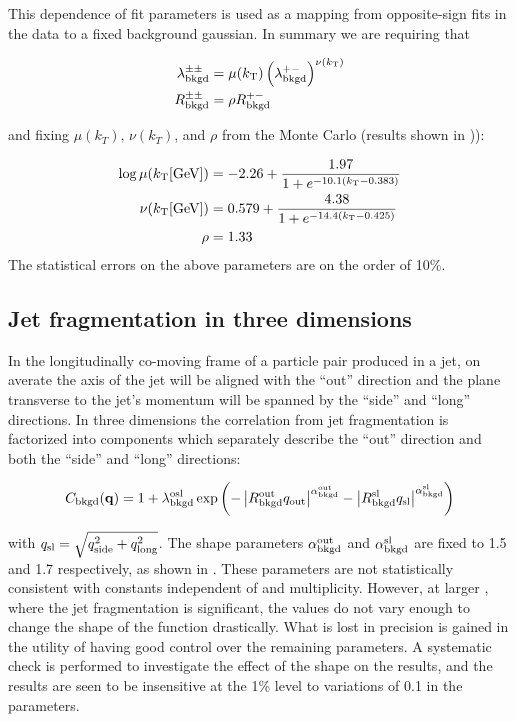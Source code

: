 This \kt dependence of fit parameters is used as a mapping from opposite-sign fits in the data to a fixed background gaussian.
In summary we are requiring that

\begin{align}
\lambda_{\mathrm{bkgd}}^{\pm\pm} &= \mu(k_\mathrm{T}) \left(\lambda_{\mathrm{bkgd}}^{+-}\right)^{\nu(k_\mathrm{T})} \label{eqn:lambdaBackPar}\\
R_{\mathrm{bkgd}}^{\pm\pm} &= \rho R_{\mathrm{bkgd}}^{+-} \label{eqn:rBackPar}
\end{align}

and fixing $\mu(k_T)$, $\nu(k_T)$, and $\rho$ from the Monte Carlo (results shown in )):

\begin{align}
\log \mu (\kt [\textrm{GeV}]) &= -2.26 + \frac{1.97}{1 + e^{-10.1 (\kt - 0.383)}} \label{eqn:mu}\\
\nu(\kt [\textrm{GeV}]) &= 0.579 + \frac{4.38}{1 + e^{-14.4 (\kt - 0.425)}} \label{eqn:nu}\\
\rho &= 1.33 \label{eqn:rho} %
\end{align}
The statistical errors on the above parameters are on the order of 10\%.


\subsection{Jet fragmentation in three dimensions}
\label{subsec:jet_frag_3d}

In the longitudinally co-moving frame of a particle pair produced in a jet, on averate the axis of the jet will be aligned with the ``out'' direction and the plane transverse to the jet's momentum will be spanned by the ``side'' and ``long'' directions. In three dimensions the correlation from jet fragmentation is factorized into components which separately describe the ``out'' direction and both the ``side'' and ``long'' directions:

\begin{align}
C_{\mathrm{bkgd}}(\mathbf{q}) = 1 + \lambda_{\mathrm{bkgd}}^\mathrm{osl} \exp\left(-\left| R_\mathrm{bkgd}^\mathrm{out} q_{\mathrm{out}} \right|^{\alpha_{\mathrm{bkgd}}^\mathrm{out}} - \left| R_\mathrm{bkgd}^\mathrm{sl} q_{\mathrm{sl}} \right|^{\alpha_{\mathrm{bkgd}}^\mathrm{sl}}\right) \label{eqn:jet_frag_form_3d}
\end{align}

with $q_{\mathrm{sl}} = \sqrt{q_{\mathrm{side}}^2 + q_{\mathrm{long}}^2}$.
The shape parameters $\alpha_{\mathrm{bkgd}}^\mathrm{out}$ and $\alpha_{\mathrm{bkgd}}^\mathrm{sl}$ are fixed to 1.5 and 1.7 respectively, as shown in .
These parameters are not statistically consistent with constants independent of \kt and multiplicity.
However, at larger \kt, where the jet fragmentation is significant, the values do not vary enough to change the shape of the function drastically.
What is lost in precision is gained in the utility of having good control over the remaining parameters.
A systematic check is performed to investigate the effect of the shape on the results, and the results are seen to be insensitive at the 1\% level to variations of 0.1 in the \abkgd parameters.


